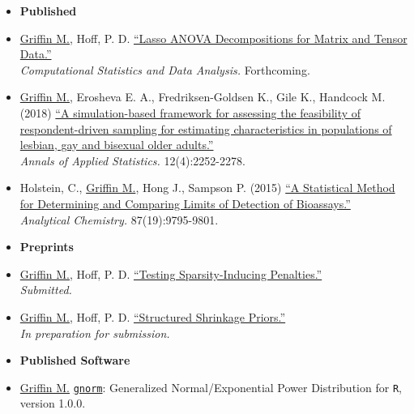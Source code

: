 \documentclass[11pt]{article}
\newcommand{\tab}{\hspace*{2em}}
\begin{document}
\begin{itemize}
	\item[]\textbf{Published}\vspace{-2mm}
	\item[] \underline{Griffin M.}, Hoff, P. D. \href{https://arxiv.org/pdf/1703.08620}{``Lasso ANOVA Decompositions for Matrix and Tensor Data.''} \\
	\tab \emph{ Computational Statistics and Data Analysis.} Forthcoming.  \vspace{-2mm}
	\item[] \underline{Griffin M.}, Erosheva E. A., Fredriksen-Goldsen K., Gile K., Handcock M. (2018) \href{https://projecteuclid.org/euclid.aoas/1542078044}{``A simulation-based framework for assessing the feasibility of respondent-driven sampling for estimating characteristics in populations of lesbian, gay and bisexual older adults.''} \\
	\tab \emph{ Annals of Applied Statistics.} 12(4):2252-2278.  \vspace{-2mm}
	\item[] Holstein, C., \underline{Griffin M.}, Hong J., Sampson P. (2015) \href{https://pubs.acs.org/doi/abs/10.1021/acs.analchem.5b02082}{``A Statistical Method for Determining and Comparing Limits of Detection of Bioassays.''} \\
	\tab \emph{Analytical Chemistry.} 87(19):9795-9801.\vspace{-2mm}
	\item[] \textbf{Preprints} \vspace{-2mm}
	\item[] \underline{Griffin M.}, Hoff, P. D. \href{https://arxiv.org/abs/1712.06230}{``Testing Sparsity-Inducing Penalties.''} \\ 
	\tab \emph{Submitted.} \vspace{-2mm} 
	\item[] \underline{Griffin M.}, Hoff, P. D. \href{https://arxiv.org/pdf/1902.05106.pdf}{``Structured Shrinkage Priors.''} \\
	\tab \emph{In preparation for submission.} \vspace{-2mm}
	\item[] \textbf{Published Software} \vspace{-2mm}
	\item[] \underline{Griffin M.} \href{https://cran.r-project.org/web/packages/gnorm/index.html}{\texttt{gnorm}}: Generalized Normal/Exponential Power Distribution for \texttt{R},  version 1.0.0.  \\
	 \vspace{-2mm}
\end{itemize}
\end{document}
